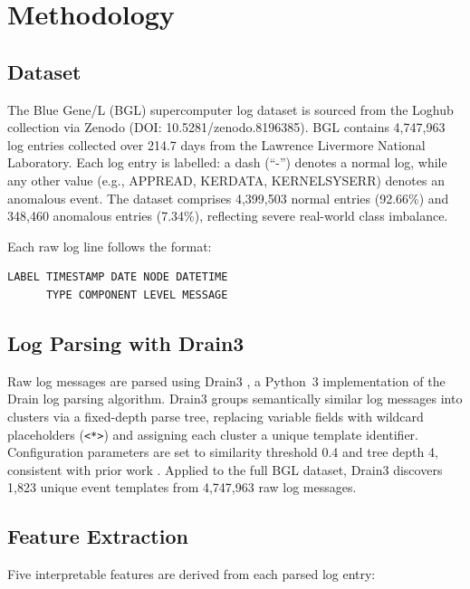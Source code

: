\documentclass[conference]{IEEEtran}
\begin{document}
\section{Methodology}
\label{sec:methodology}

\subsection{Dataset}

The Blue Gene/L (BGL) supercomputer log dataset is sourced from the Loghub
collection \cite{zhu2023loghub} via Zenodo (DOI: 10.5281/zenodo.8196385).
BGL contains 4{,}747{,}963 log entries collected over 214.7 days from the
Lawrence Livermore National Laboratory. Each log entry is labelled: a dash
(``-'') denotes a normal log, while any other value (e.g., APPREAD, KERDATA,
KERNELSYSERR) denotes an anomalous event. The dataset comprises 4{,}399{,}503
normal entries (92.66\%) and 348{,}460 anomalous entries (7.34\%), reflecting
severe real-world class imbalance.

Each raw log line follows the format:
\begin{verbatim}
LABEL TIMESTAMP DATE NODE DATETIME
      TYPE COMPONENT LEVEL MESSAGE
\end{verbatim}

\subsection{Log Parsing with Drain3}

Raw log messages are parsed using Drain3 \cite{he2017drain}, a Python~3
implementation of the Drain log parsing algorithm. Drain3 groups semantically
similar log messages into clusters via a fixed-depth parse tree, replacing
variable fields with wildcard placeholders (\texttt{<*>}) and assigning each
cluster a unique template identifier. Configuration parameters are set to
similarity threshold 0.4 and tree depth 4, consistent with prior work
\cite{nguyen2023}. Applied to the full BGL dataset, Drain3 discovers 1{,}823
unique event templates from 4{,}747{,}963 raw log messages.

\subsection{Feature Extraction}

Five interpretable features are derived from each parsed log entry:
\end{document}
